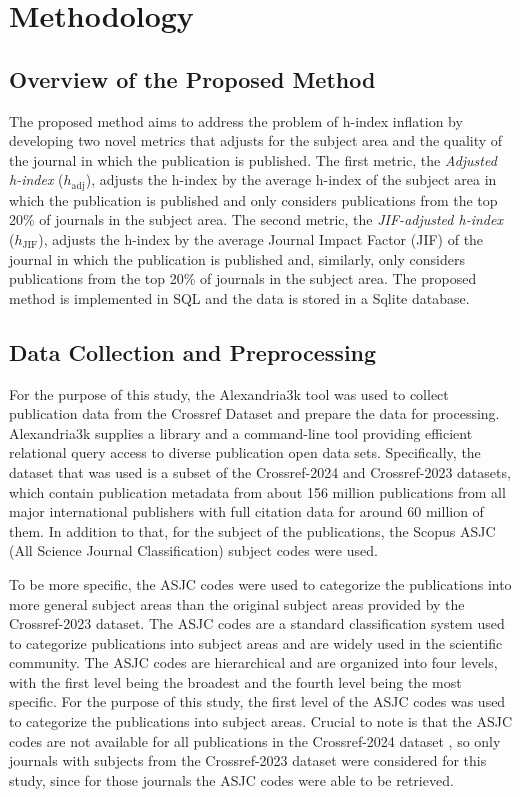\chapter{Methodology}
\label{ch:methods}

\section{Overview of the Proposed Method}

The proposed method aims to address the problem of h-index inflation by
developing two novel metrics that adjusts for the subject area and the quality
of the journal in which the publication is published. The first metric, the
\textit{Adjusted h-index} ($h_{\text{adj}}$), adjusts the h-index by the
average h-index of the subject area in which the publication is published and
only considers publications from the top 20\% of journals in the subject area.
The second metric, the \textit{JIF-adjusted h-index} ($h_{\text{JIF}}$),
adjusts the h-index by the average Journal Impact Factor (JIF) of the journal
in which the publication is published and, similarly, only considers
publications from the top 20\% of journals in the subject area. The proposed
method is implemented in SQL and the data is stored in a Sqlite database.

\section{Data Collection and Preprocessing}

For the purpose of this study, the Alexandria3k \cite{Spi23g} tool was used to
collect publication data from the Crossref Dataset \cite{Crossref2020} and
prepare the data for processing. Alexandria3k supplies a library and a
command-line tool providing efficient relational query access to diverse
publication open data sets. Specifically, the dataset that was used is a subset
of the Crossref-2024 and Crossref-2023 datasets, which contain publication
metadata from about 156 million publications from all major international
publishers with full citation data for around 60 million of them. In addition
to that, for the subject of the publications, the Scopus ASJC (All Science
Journal Classification) subject codes were used.

To be more specific, the ASJC codes were used to categorize the publications
into more general subject areas than the original subject areas provided by the
Crossref-2023 dataset. The ASJC codes are a standard classification system used
to categorize publications into subject areas and are widely used in the
scientific community. The ASJC codes are hierarchical and are organized into
four levels, with the first level being the broadest and the fourth level being
the most specific. For the purpose of this study, the first level of the ASJC
codes was used to categorize the publications into subject areas. Crucial to
note is that the ASJC codes are not available for all publications in the
Crossref-2024 dataset \cite{crossrefSubjectCodes2024}, so only journals with
subjects from the Crossref-2023 dataset were considered for this study, since
for those journals the ASJC codes were able to be retrieved.

